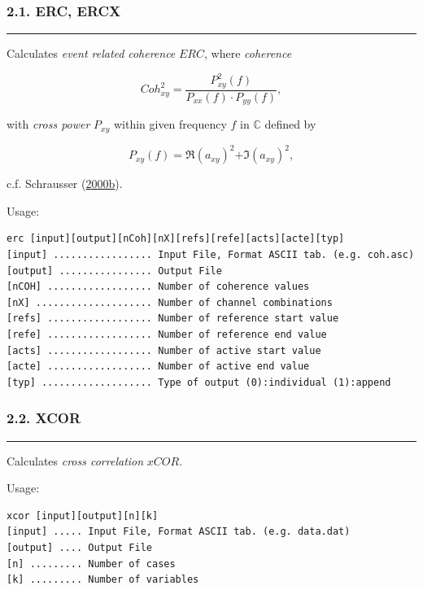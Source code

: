 \documentclass[
]{article}
\begin{document}
\hypertarget{erc-ercx}{%
\subsubsection{2.1. ERC, ERCX}\label{erc-ercx}}

\begin{center}\rule{0.5\linewidth}{0.5pt}\end{center}

Calculates \emph{event related} \emph{coherence} \(ERC\), where
\emph{coherence}

\[Coh_{xy}^{2} = \frac{P_{xy}^{2}(f)}{P_{xx}(f) \cdot P_{yy}(f)},\]

with \emph{cross power} \(P_{xy}\) within given frequency \(f\) in
\(\mathbb{C}\) defined by

\[P_{xy}(f)\mathfrak{= R}\left( a_{xy} \right)^{2}\mathfrak{+ I}\left( a_{xy} \right)^{2},\]

c.f. Schrausser
(\href{http://doi.org/10.13140/RG.2.2.28637.90083}{2000b}).

Usage:

\begin{verbatim}
erc [input][output][nCoh][nX][refs][refe][acts][acte][typ]
[input] ................. Input File, Format ASCII tab. (e.g. coh.asc)
[output] ................ Output File
[nCOH] .................. Number of coherence values 
[nX] .................... Number of channel combinations
[refs] .................. Number of reference start value 
[refe] .................. Number of reference end value
[acts] .................. Number of active start value
[acte] .................. Number of active end value
[typ] ................... Type of output (0):individual (1):append
\end{verbatim}

\hypertarget{xcor}{%
\subsubsection{2.2. XCOR}\label{xcor}}

\begin{center}\rule{0.5\linewidth}{0.5pt}\end{center}

Calculates \emph{cross correlation} \(xCOR\).

Usage:

\begin{verbatim}
xcor [input][output][n][k]
[input] ..... Input File, Format ASCII tab. (e.g. data.dat)
[output] .... Output File
[n] ......... Number of cases
[k] ......... Number of variables
\end{verbatim}
\end{document}
